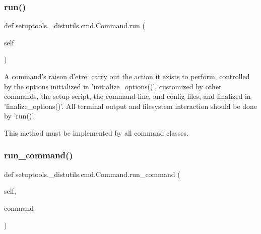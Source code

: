 \mbox{\label{classsetuptools_1_1__distutils_1_1cmd_1_1Command_aaf17daceac0b573a30f221bc4b2ffc59}} 
\subsubsection{\texorpdfstring{run()}{run()}}
{\footnotesize\ttfamily def setuptools.\+\_\+distutils.\+cmd.\+Command.\+run (\begin{DoxyParamCaption}\item[{}]{self }\end{DoxyParamCaption})}

\begin{DoxyVerb}A command's raison d'etre: carry out the action it exists to
perform, controlled by the options initialized in
'initialize_options()', customized by other commands, the setup
script, the command-line, and config files, and finalized in
'finalize_options()'.  All terminal output and filesystem
interaction should be done by 'run()'.

This method must be implemented by all command classes.
\end{DoxyVerb}
 \mbox{\label{classsetuptools_1_1__distutils_1_1cmd_1_1Command_a98e33c257a53ec1d0bc9e649e60af970}} 
\subsubsection{\texorpdfstring{run\+\_\+command()}{run\_command()}}
{\footnotesize\ttfamily def setuptools.\+\_\+distutils.\+cmd.\+Command.\+run\+\_\+command (\begin{DoxyParamCaption}\item[{}]{self,  }\item[{}]{command }\end{DoxyParamCaption})}

